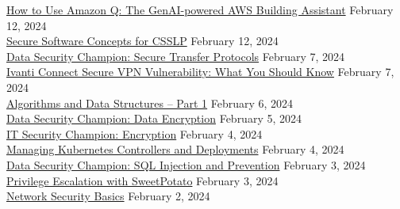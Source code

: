 \documentclass[10pt]{res} %
\begin{document}
\begin{resume}
\href{https://bjdelacruz.dev/files/certificates/pluralsight/How_to_Use_Amazon_Q_-_The_GenAI-powered_AWS_Building_Assistant.pdf}{\color{blue}How to Use Amazon Q: The GenAI-powered AWS Building Assistant} \hfill February 12, 2024 \\
\href{https://bjdelacruz.dev/files/certificates/pluralsight/Secure_Software_Concepts_for_CSSLP.pdf}{\color{blue}Secure Software Concepts for CSSLP\textsuperscript{\textregistered}} \hfill February 12, 2024 \\
\href{https://bjdelacruz.dev/files/certificates/pluralsight/Data_Security_Champion_-_Secure_Transfer_Protocols.pdf}{\color{blue}Data Security Champion: Secure Transfer Protocols} \hfill February 7, 2024 \\
\href{https://bjdelacruz.dev/files/certificates/pluralsight/Ivanti_Connect_Secure_VPN_Vulnerability_-_What_You_Should_Know.pdf}{\color{blue}Ivanti Connect Secure VPN Vulnerability: What You Should Know} \hfill February 7, 2024 \\
\href{https://bjdelacruz.dev/files/certificates/pluralsight/Algorithms_and_Data_Structures_-_Part_1.pdf}{\color{blue}Algorithms and Data Structures -- Part 1} \hfill February 6, 2024 \\
\href{https://bjdelacruz.dev/files/certificates/pluralsight/Data_Security_Champion_-_Data_Encryption.pdf}{\color{blue}Data Security Champion: Data Encryption} \hfill February 5, 2024 \\
\href{https://bjdelacruz.dev/files/certificates/pluralsight/IT_Security_Champion_-_Encryption.pdf}{\color{blue}IT Security Champion: Encryption} \hfill February 4, 2024 \\
\href{https://bjdelacruz.dev/files/certificates/pluralsight/Managing_Kubernetes_Controllers_and_Deployments.pdf}{\color{blue}Managing Kubernetes Controllers and Deployments} \hfill February 4, 2024 \\
\href{https://bjdelacruz.dev/files/certificates/pluralsight/Data_Security_Champion_-_SQL_Injection_and_Prevention.pdf}{\color{blue}Data Security Champion: SQL Injection and Prevention} \hfill February 3, 2024 \\
\href{https://bjdelacruz.dev/files/certificates/pluralsight/Privilege_Escalation_with_SweetPotato.pdf}{\color{blue}Privilege Escalation with SweetPotato} \hfill February 3, 2024 \\
\href{https://bjdelacruz.dev/files/certificates/pluralsight/Network_Security_Basics.pdf}{\color{blue}Network Security Basics} \hfill February 2, 2024 \\

\end{resume}
\end{document}
